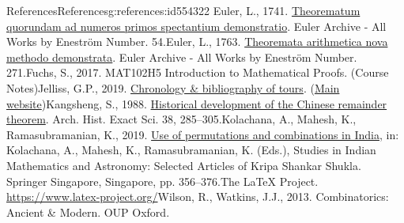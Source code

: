 \documentclass[oneside,10pt,]{book}
\numberwithin{equation}{section}
\begin{document}
\begin{references-chapter-numberless}{References}{}{References}{}{}{g:references:id554322}
Euler, L., 1741. \href{https://scholarlycommons.pacific.edu/euler-works/54/}{Theorematum quorundam ad numeros primos spectantium demonstratio}. Euler Archive - All Works by Eneström Number. 54.Euler, L., 1763. \href{https://scholarlycommons.pacific.edu/euler-works/271/}{Theoremata arithmetica nova methodo demonstrata}. Euler Archive - All Works by Eneström Number. 271.Fuchs, S., 2017. MAT102H5 Introduction to Mathematical Proofs. (Course Notes)Jelliss, G.P., 2019. \href{https://www.mayhematics.com/p/KTN12_Bibliography.pdf}{Chronology \& bibliography of tours}. (\href{https://www.mayhematics.com/p/p.htm}{Main website})Kangsheng, S., 1988. \href{https://doi.org/10.1007/BF00357063}{Historical development of the Chinese remainder theorem}. Arch. Hist. Exact Sci. 38, 285–305.Kolachana, A., Mahesh, K., Ramasubramanian, K., 2019. \href{https://doi.org/10.1007/978-981-13-7326-8_18}{Use of permutations and combinations in India}, in: Kolachana, A., Mahesh, K., Ramasubramanian, K. (Eds.), Studies in Indian Mathematics and Astronomy: Selected Articles of Kripa Shankar Shukla. Springer Singapore, Singapore, pp. 356–376.The LaTeX Project. \href{https://www.latex-project.org/}{https:\slash{}\slash{}www.latex-project.org\slash{}}Wilson, R., Watkins, J.J., 2013. Combinatorics: Ancient \& Modern. OUP Oxford.\end{references-chapter-numberless}
\end{document}

